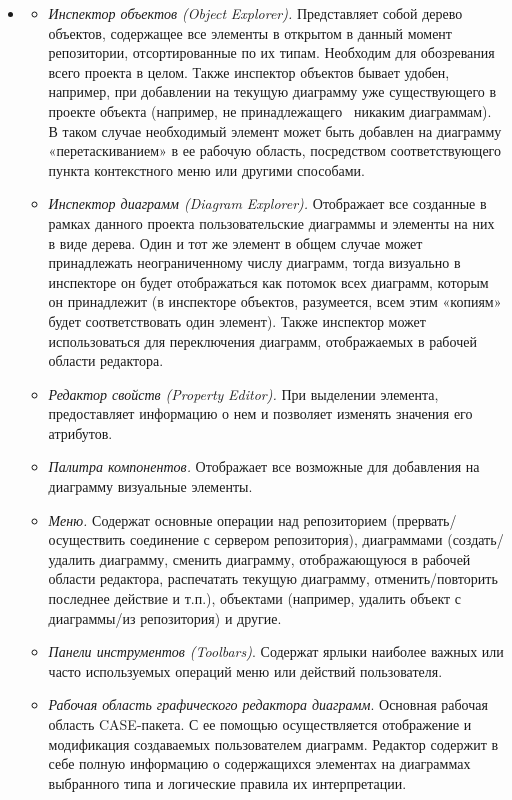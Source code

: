 \documentclass[a4paper]{article}
\newcommand\liststyleWWviiiNumvii{%
\renewcommand\labelitemi{[F0B7?]}
\renewcommand\labelitemii{o}
\renewcommand\labelitemiii{[F0A7?]}
\renewcommand\labelitemiv{[F0B7?]}
}
\begin{document}
\liststyleWWviiiNumvii
\begin{itemize}
\item \begin{itemize}
\item {
\textit{Инспектор объектов
(}\foreignlanguage{english}{\textit{Object}}\textit{
}\foreignlanguage{english}{\textit{Explorer}}\textit{). }Представляет
собой дерево объектов, содержащее все элементы в открытом в данный
момент репозитории, отсортированные по их типам. Необходим для
обозревания всего проекта в целом. Также инспектор объектов бывает
удобен, например, при добавлении на текущую диаграмму уже существующего
в проекте объекта (например, не принадлежащего \ никаким диаграммам). В
таком случае необходимый элемент может быть добавлен на диаграмму
«перетаскиванием» в ее рабочую область, посредством соответствующего
пункта контекстного меню или другими способами.}
\item {
\textit{Инспектор диаграмм
(}\foreignlanguage{english}{\textit{Diagram}}\textit{
}\foreignlanguage{english}{\textit{Explorer}}\textit{).} Отображает все
созданные в рамках данного проекта пользовательские диаграммы и
элементы на них в виде дерева. Один и тот же элемент в общем случае
может принадлежать неограниченному числу диаграмм, тогда визуально в
инспекторе он будет отображаться как потомок всех диаграмм, которым он
принадлежит (в инспекторе объектов, разумеется, всем этим «копиям»
будет соответствовать один элемент). Также инспектор может
использоваться для переключения диаграмм, отображаемых в рабочей
области редактора.}
\item {
\textit{Редактор свойств
(}\foreignlanguage{english}{\textit{Property}}\textit{
}\foreignlanguage{english}{\textit{Editor}}\textit{). }При выделении
элемента, предоставляет информацию о нем и позволяет изменять значения
его атрибутов.}
\item {
\textit{Палитра компонентов.} Отображает все возможные для добавления на
диаграмму визуальные элементы. }
\item {
\textit{Меню. }Содержат основные операции над репозиторием
(прервать/осуществить соединение с сервером репозитория), диаграммами
(создать/удалить диаграмму, сменить диаграмму, отображающуюся в рабочей
области редактора, распечатать текущую диаграмму, отменить/повторить
последнее действие и т.п.), объектами (например, удалить объект с
диаграммы/из репозитория) и другие.}
\item {
\textit{Панели инструментов
(}\foreignlanguage{english}{\textit{Toolbars}}\textit{)}. Содержат
ярлыки наиболее важных или часто используемых операций меню или
действий пользователя.}
\item {
\textit{Рабочая область графического редактора диаграмм}. Основная
рабочая область \foreignlanguage{english}{CASE}{}-пакета. С ее помощью
осуществляется отображение и модификация создаваемых пользователем
диаграмм. Редактор содержит в себе полную информацию о содержащихся
элементах на диаграммах выбранного типа и логические правила их
интерпретации.}
\end{itemize}
\end{itemize}
\end{document}
